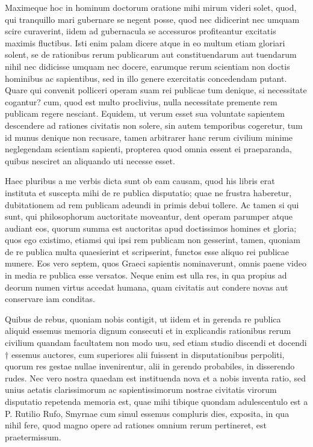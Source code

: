  Maximeque hoc in hominum doctorum oratione mihi mirum videri solet, quod, qui tranquillo mari gubernare se negent posse, quod nec didicerint nec umquam scire curaverint, iidem ad gubernacula se accessuros profiteantur excitatis maximis fluctibus. Isti enim palam dicere atque in eo multum etiam gloriari solent, se de rationibus rerum publicarum aut constituendarum aut tuendarum nihil nec didicisse umquam nec docere, earumque rerum scientiam non doctis hominibus ac sapientibus, sed in illo genere exercitatis concedendam putant. Quare qui convenit polliceri operam suam rei publicae tum denique, si necessitate cogantur? cum, quod est multo proclivius, nulla necessitate premente rem publicam regere nesciant. Equidem, ut verum esset sua voluntate sapientem descendere ad rationes civitatis non solere, sin autem temporibus cogeretur, tum id munus denique non recusare, tamen arbitrarer hanc rerum civilium minime neglegendam scientiam sapienti, propterea quod omnia essent ei praeparanda, quibus nesciret an aliquando uti necesse esset.

 Haec pluribus a me verbis dicta sunt ob eam causam, quod his libris erat instituta et suscepta mihi de re publica disputatio; quae ne frustra haberetur, dubitationem ad rem publicam adeundi in primis debui tollere. Ac tamen si qui sunt, qui philosophorum auctoritate moveantur, dent operam parumper atque audiant eos, quorum summa est auctoritas apud doctissimos homines et gloria; quos ego existimo, etiamsi qui ipsi rem publicam non gesserint, tamen, quoniam de re publica multa quaesierint et scripserint, functos esse aliquo rei publicae munere. Eos vero septem, quos Graeci sapientis nominaverunt, omnis paene video in media re publica esse versatos. Neque enim est ulla res, in qua propius ad deorum numen virtus accedat humana, quam civitatis aut condere novas aut conservare iam conditas.

 Quibus de rebus, quoniam nobis contigit, ut iidem et in gerenda re publica aliquid essemus memoria dignum consecuti et in explicandis rationibus rerum civilium quandam facultatem non modo usu, sed etiam studio discendi et docendi † essemus auctores, cum superiores alii fuissent in disputationibus perpoliti, quorum res gestae nullae invenirentur, alii in gerendo probabiles, in disserendo rudes. Nec vero nostra quaedam est instituenda nova et a nobis inventa ratio, sed unius aetatis clarissimorum ac sapientissimorum nostrae civitatis virorum disputatio repetenda memoria est, quae mihi tibique quondam adulescentulo est a P. Rutilio Rufo, Smyrnae cum simul essemus compluris dies, exposita, in qua nihil fere, quod magno opere ad rationes omnium rerum pertineret, est praetermissum.

